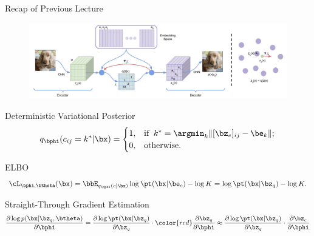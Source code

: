 \documentclass{beamer}
\begin{document}
\begin{frame}{Recap of Previous Lecture}
	\begin{figure}
		\centering
		\includegraphics[width=0.85\linewidth]{figs/vqvae}
	\end{figure}
	\vspace{-0.3cm}
	\begin{block}{Deterministic Variational Posterior}
		\vspace{-0.3cm}
		\[
			q_{\bphi}(c_{ij} = k^* | \bx) = \begin{cases}
				1,  & \text{if}\;\; k^* = \argmin_k \| [\bz_e]_{ij} - \be_k \|; \\
				0,  & \text{otherwise}.
			\end{cases}
		\]
		\vspace{-0.5cm}
	\end{block}
	\begin{block}{ELBO}
		\vspace{-0.6cm}
		\[
			\cL_{\bphi, \btheta}(\bx)  = \bbE_{q_{\bphi}(c| \bx)} \log \pt(\bx| \be_{c}) - \log K =  \log \pt(\bx| \bz_q) - \log K.
		\]
		\vspace{-0.6cm}
	\end{block}
	\begin{block}{Straight-Through Gradient Estimation}
		\vspace{-0.6cm}
		\[
			\frac{\partial \log p(\bx | \bz_q , \btheta)}{\partial \bphi} = \frac{\partial \log \pt(\bx| \bz_q)}{\partial \bz_q} \cdot {\color{red}\frac{\partial \bz_q}{\partial \bphi}} \approx \frac{\partial \log \pt(\bx| \bz_q)}{\partial \bz_q} \cdot \frac{\partial \bz_e}{\partial \bphi}
		\]
	\end{block}
\end{frame}
\end{document}
